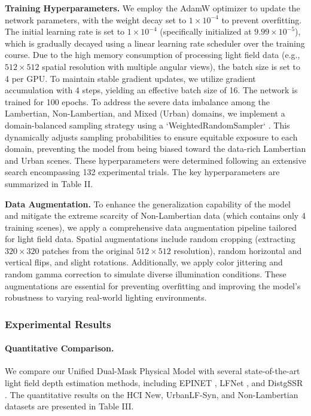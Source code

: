 \textbf{Training Hyperparameters.} 
We employ the AdamW optimizer to update the network parameters, with the weight decay set to $1 \times 10^{-4}$ to prevent overfitting. The initial learning rate is set to $1 \times 10^{-4}$ (specifically initialized at $9.99 \times 10^{-5}$), which is gradually decayed using a linear learning rate scheduler over the training course. Due to the high memory consumption of processing light field data (e.g., $512 \times 512$ spatial resolution with multiple angular views), the batch size is set to 4 per GPU. To maintain stable gradient updates, we utilize gradient accumulation with 4 steps, yielding an effective batch size of 16. The network is trained for 100 epochs. To address the severe data imbalance among the Lambertian, Non-Lambertian, and Mixed (Urban) domains, we implement a domain-balanced sampling strategy using a `WeightedRandomSampler` . This dynamically adjusts sampling probabilities to ensure equitable exposure to each domain, preventing the model from being biased toward the data-rich Lambertian and Urban scenes. These hyperparameters were determined following an extensive search encompassing 132 experimental trials. The key hyperparameters are summarized in Table II.

\textbf{Data Augmentation.} 
To enhance the generalization capability of the model and mitigate the extreme scarcity of Non-Lambertian data (which contains only 4 training scenes), we apply a comprehensive data augmentation pipeline tailored for light field data. Spatial augmentations include random cropping (extracting $320 \times 320$ patches from the original $512 \times 512$ resolution), random horizontal and vertical flips, and slight rotations. Additionally, we apply color jittering and random gamma correction to simulate diverse illumination conditions. These augmentations are essential for preventing overfitting and improving the model's robustness to varying real-world lighting environments.

\subsubsection{Experimental Results}

\paragraph{Quantitative Comparison.}
We compare our Unified Dual-Mask Physical Model with several state-of-the-art light field depth estimation methods, including EPINET , LFNet , and DistgSSR . The quantitative results on the HCI New, UrbanLF-Syn, and Non-Lambertian datasets are presented in Table III.


